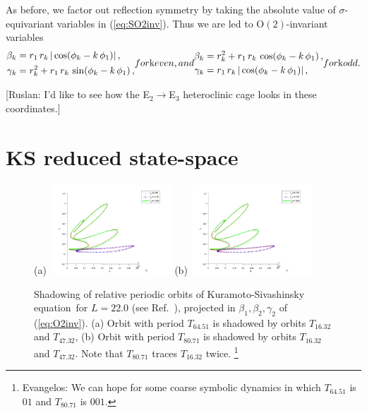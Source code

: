 \documentclass[aip,cha,showpacs,twocolumn,
 		  reprint]{revtex4-1} %
\newcommand{\bseq}{\begin{subequations}}
\newcommand{\eseq}{\end{subequations}}
\newcommand{\refref} [1] {Ref.~\cite{#1}}
\newcommand{\refeq}  [1] {(\ref{#1})}
\newcommand{\KSe}{Kuramoto-Siva\-shin\-sky equation}
\newcommand{\On}[1]{\ensuremath{\textrm{O}(#1)}}
\newcommand{\Refl}{\ensuremath{\sigma}}
\newcommand{\ES}[1]{\footnote{Evangelos: #1}}
\begin{document}
As before, we factor out reflection symmetry by taking the absolute value
of $\Refl$-equivariant variables in \refeq{eq:SO2inv}.
Thus we are led to $\On{2}$-invariant variables
\bseq\label{eq:O2inv}
  \begin{align}
    \beta_k &=
		    r_1\,r_k\, |\cos(\phi_k-k\,\phi_1)|\,, \\
    \gamma_k &=
		    r_k^2+r_1\,r_k\,\sin(\phi_k-k\,\phi_1)\,,
  \end{align}
for $k$ even, and
  \begin{align}
    \beta_k &=
		    r_k^2+r_1\,r_k\, \cos(\phi_k-k\,\phi_1)\,, \\
    \gamma_k &=
		    r_1\,r_k\, |\cos(\phi_k-k\,\phi_1)|\,,
  \end{align}
for $k$ odd.
\eseq

[Ruslan: I'd like to see how the E$_2 \to $E$_3$ heteroclinic cage looks in these coordinates.]

\section{KS reduced state-space}

\begin{figure}
 (a)~\includegraphics[width=0.40\textwidth]{../figs/ks22rpo_shad1}
 (b)~\includegraphics[width=0.40\textwidth]{../figs/ks22rpo_shad2}
\caption{
 Shadowing of relative periodic orbits of \KSe\ for $L=22.0$ (see \refref{SCD07}),
projected in $\beta_1, \beta_2, \gamma_2$ of
\refeq{eq:O2inv}. (a) Orbit with period $T_{64.51}$ is shadowed by
orbits $T_{16.32}$ and $T_{47.32}$, (b) Orbit with period
$T_{80.71}$ is shadowed by orbits $T_{16.32}$ and $T_{47.32}$. Note
that $T_{80.71}$ traces $T_{16.32}$ twice.
\ES{We can hope for some coarse symbolic dynamics in which  $T_{64.51}$  is $01$ and
$T_{80.71}$ is $001$.}
}
\label{fig:rpo_shad}
\end{figure}
\end{document}
